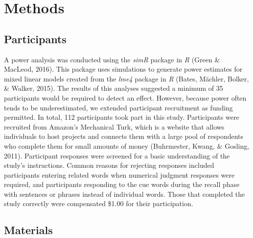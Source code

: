 \documentclass[english,man]{apa6}
\theoremstyle{definition}
\theoremstyle{definition}
\theoremstyle{definition}
\theoremstyle{remark}
\begin{document}
\section{Methods}\label{methods}

\subsection{Participants}\label{participants}

A power analysis was conducted using the \emph{simR} package in \emph{R}
(Green \& MacLeod, 2016). This package uses simulations to generate
power estimates for mixed linear models created from the \emph{lme4}
package in \emph{R} (Bates, Mächler, Bolker, \& Walker, 2015). The
results of this analyses suggested a minimum of 35 participants would be
required to detect an effect. However, because power often tends to be
underestimated, we extended participant recruitment as funding
permitted. In total, 112 participants took part in this study.
Participants were recruited from Amazon's Mechanical Turk, which is a
website that allows individuals to host projects and connects them with
a large pool of respondents who complete them for small amounts of money
(Buhrmester, Kwang, \& Gosling, 2011). Participant responses were
screened for a basic understanding of the study's instructions. Common
reasons for rejecting responses included participants entering related
words when numerical judgment responses were required, and participants
responding to the cue words during the recall phase with sentences or
phrases instead of individual words. Those that completed the study
correctly were compensated \$1.00 for their participation.

\subsection{Materials}\label{materials}
\end{document}
